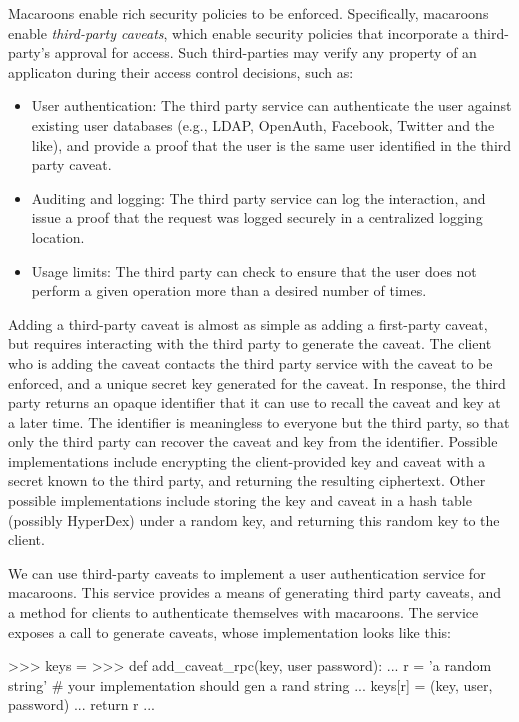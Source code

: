 Macaroons enable rich security policies to be enforced. Specifically, macaroons 
enable {\em third-party caveats}, which enable security policies that incorporate
a third-party's approval for access.  Such third-parties may verify any property 
of an applicaton during their access control decisions, such as:

\begin{itemize}
    \item User authentication:  The third party service can authenticate the
        user against existing user databases (e.g., LDAP, OpenAuth, Facebook, Twitter and the like), and
        provide a proof that the user is the same user identified in the third
        party caveat.
    \item Auditing and logging:  The third party service can log the
        interaction, and issue a proof that the request was logged securely in a
        centralized logging location.
    \item Usage limits: The third party can check to ensure that the user
        does not perform a given operation more than a desired number of
        times.
\end{itemize}

Adding a third-party caveat is almost as simple as adding a first-party caveat,
but requires interacting with the third party to generate the caveat.  The
client who is adding the caveat contacts the third party service with the caveat
to be enforced, and a unique secret key generated for the caveat.  In response,
the third party returns an opaque identifier that it can use to recall the
caveat and key at a later time.  The identifier is meaningless to everyone but
the third party, so that only the third party can recover the caveat and key
from the identifier.  Possible implementations include encrypting the
client-provided key and caveat with a secret known to the third party, and
returning the resulting ciphertext.  Other possible implementations include
storing the key and caveat in a hash table (possibly HyperDex) under a random
key, and returning this random key to the client.

We can use third-party caveats to implement a user authentication service for
macaroons.  This service provides a means of generating third party caveats, and
a method for clients to authenticate themselves with macaroons.  The service
exposes a call to generate caveats, whose implementation looks like this:

\begin{pythoncode}
>>> keys = {}
>>> def add_caveat_rpc(key, user password):
...     r = 'a random string' # your implementation should gen a rand string
...     keys[r] = (key, user, password)
...     return r
...
\end{pythoncode}

